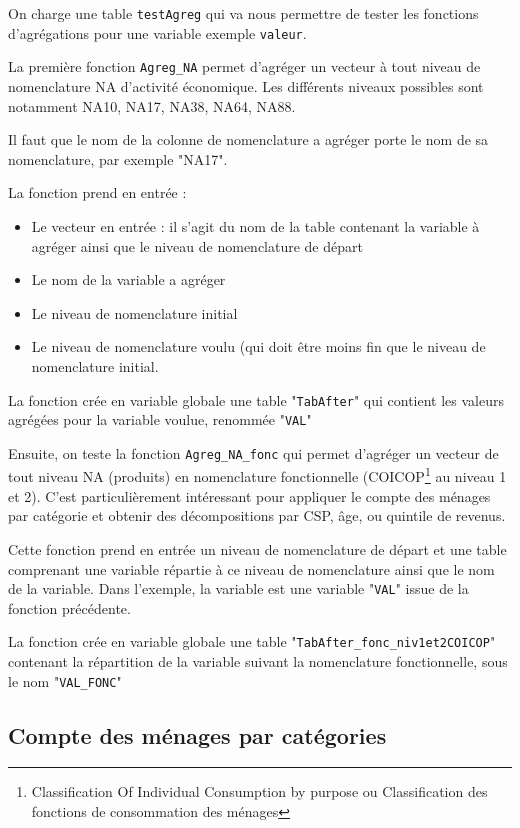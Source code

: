 \documentclass[a4paper,french,11pt]{article}
\begin{document}
On charge une table \verb|testAgreg| qui va nous permettre de tester les fonctions d'agr\'egations pour une variable exemple \verb|valeur|.

La premi\`ere fonction \verb|Agreg_NA| permet d'agr\'eger un vecteur \`a tout niveau de nomenclature NA d'activit\'e \'economique. Les diff\'erents niveaux possibles sont notamment NA10, NA17, NA38, NA64, NA88.

Il faut que le nom de la colonne de nomenclature a agr\'eger porte le nom de sa nomenclature, par exemple "NA17".



La fonction prend en entr\'ee : 
\begin{itemize}
\item Le vecteur en entr\'ee : il s'agit du nom de la table contenant la variable \`a agr\'eger ainsi que le niveau de nomenclature de d\'epart
\item Le nom de la variable a agr\'eger 
\item Le niveau de nomenclature initial
\item Le niveau de nomenclature voulu (qui doit \^etre moins fin que le niveau de nomenclature initial.
\end{itemize}

La fonction cr\'ee en variable globale une table "\verb|TabAfter|" qui contient les valeurs agr\'eg\'ees pour la variable voulue, renomm\'ee "\verb|VAL|"

Ensuite, on teste la fonction \verb|Agreg_NA_fonc| qui permet d'agr\'eger un vecteur de tout niveau NA (produits) en nomenclature fonctionnelle (COICOP\footnote{Classification Of Individual Consumption by purpose ou Classification des fonctions de consommation des m\'enages} au niveau 1 et 2). C'est particuli\`erement int\'eressant pour appliquer le compte des m\'enages par cat\'egorie et obtenir des d\'ecompositions par CSP, \^age, ou quintile de revenus. 

Cette fonction prend en entr\'ee un niveau de nomenclature de d\'epart et une table comprenant une variable r\'epartie \`a ce niveau de nomenclature ainsi que le nom de la variable. Dans l'exemple, la variable est une variable "\verb|VAL|" issue de la fonction pr\'ec\'edente.

La fonction cr\'ee en variable globale une table "\verb|TabAfter_fonc_niv1et2COICOP|" contenant la r\'epartition de la variable suivant la nomenclature fonctionnelle, sous le nom "\verb|VAL_FONC|"


\subsection{Compte des m\'enages par cat\'egories}
\end{document}
